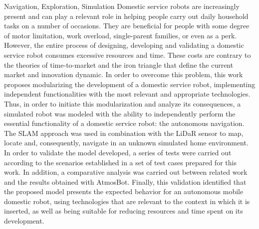 \begin{englishabstract}{Navigation, Exploration, Simulation}
Domestic service robots are increasingly present and can play a relevant role in helping people carry out daily household tasks on a number of occasions. They are beneficial for people with some degree of motor limitation, work overload, single-parent families, or even as a perk. However, the entire process of designing, developing and validating a domestic service robot consumes excessive resources and time. These costs are contrary to the theories of time-to-market and the iron triangle that define the current market and innovation dynamic. In order to overcome this problem, this work proposes modularizing the development of a domestic service robot, implementing independent functionalities with the most relevant and appropriate technologies. Thus, in order to initiate this modularization and analyze its consequences, a simulated robot was modeled with the ability to independently perform the essential functionality of a domestic service robot: the autonomous navigation. The SLAM approach was used in combination with the LiDaR sensor to map, locate and, consequently, navigate in an unknown simulated home environment. In order to validate the model developed, a series of tests were carried out according to the scenarios established in a set of test cases prepared for this work. In addition, a comparative analysis was carried out between related work and the results obtained with AtmosBot. Finally, this validation identified that the proposed model presents the expected behavior for an autonomous mobile domestic robot, using technologies that are relevant to the context in which it is inserted, as well as being suitable for reducing resources and time spent on its development.
\end{englishabstract}
